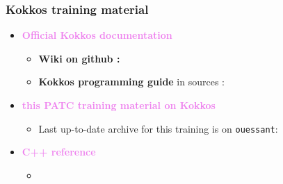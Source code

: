 \begin{frame}
  \frametitle{Kokkos training material}
  
  \begin{itemize}
  \item {\bf \textcolor{violet}{\large Official Kokkos documentation}}
    \begin{itemize}
    \item {\bf Wiki on github :} 
    \item {\bf Kokkos programming guide} in sources : 
    \end{itemize}
  \item {\bf \textcolor{violet}{\large this PATC training material on Kokkos}}
    \begin{itemize}
    \item Last up-to-date archive for this training is on \texttt{ouessant}:\\
    \end{itemize}
  \item {\bf \textcolor{violet}{\large C++ reference}}
    \begin{itemize}
    \item {}
    \end{itemize}
  \end{itemize}

\end{frame}

